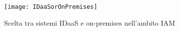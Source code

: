 \begin{figure}[h!]
\begin{center}
\texttt{[image: IDaaSorOnPremises]}
\caption[Scelta tra sistemi IDaaS e on-premises nell'ambito IAM]{Scelta tra sistemi IDaaS e on-premises nell'ambito IAM\protect\footnotemark}
\label{fig:IDaaSvsorPremises}
\end{center}
\end{figure}
\newpage